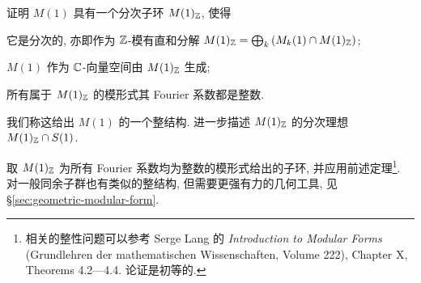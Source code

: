 \begin{exercise}\label{exo:M(1)-integral}
	证明 $M(1)$ 具有一个分次子环 $M(1)_{\mathbb{Z}}$, 使得
	\begin{compactitem}
		\item 它是分次的, 亦即作为 $\mathbb{Z}$-模有直和分解 $M(1)_{\mathbb{Z}} = \bigoplus_k \left( M_k(1) \cap M(1)_{\mathbb{Z}} \right)$;
		\item $M(1)$ 作为 $\mathbb{C}$-向量空间由 $M(1)_{\mathbb{Z}}$ 生成;
		\item 所有属于 $M(1)_{\mathbb{Z}}$ 的模形式其 Fourier 系数都是整数.
	\end{compactitem}
	我们称这给出 $M(1)$ 的一个整结构. 进一步描述 $M(1)_{\mathbb{Z}}$ 的分次理想 $M(1)_{\mathbb{Z}} \cap S(1)$.
	
	\begin{hint}
		取 $M(1)_{\mathbb{Z}}$ 为所有 Fourier 系数均为整数的模形式给出的子环, 并应用前述定理\footnote{相关的整性问题可以参考 Serge Lang 的 \textit{Introduction to Modular Forms} (Grundlehren der mathematischen Wissenschaften, Volume 222), Chapter X, Theorems 4.2---4.4. 论证是初等的.}. 对一般同余子群也有类似的整结构, 但需要更强有力的几何工具, 见 \S\ref{sec:geometric-modular-form}.
	\end{hint}
\end{exercise}

